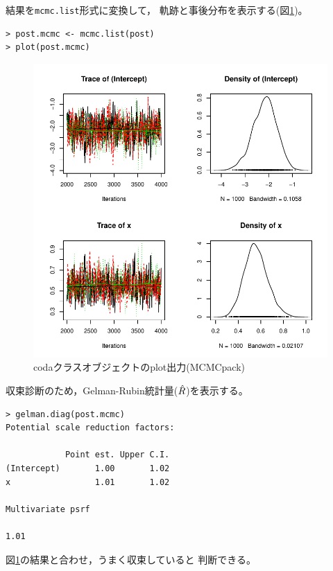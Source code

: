 \documentclass[11pt,uplatex]{jsarticle}
\begin{document}
結果を\texttt{mcmc.list}形式に変換して，
軌跡と事後分布を表示する(図\ref{plot_coda_mcmcpack})。
\begin{lstlisting}
> post.mcmc <- mcmc.list(post)
> plot(post.mcmc)
\end{lstlisting}


\begin{figure}[htbp]
	\begin{center}
		\includegraphics[bb=0 0 400 400, clip, width=300 bp]{example2_results.pdf}
	\end{center}
	\caption{\textsf{coda}クラスオブジェクトのplot出力(MCMCpack)}
	\label{plot_coda_mcmcpack}
\end{figure}

収束診断のため，Gelman-Rubin統計量($\Hat{R}$)を表示する。
\begin{lstlisting}
> gelman.diag(post.mcmc)
Potential scale reduction factors:

            Point est. Upper C.I.
(Intercept)       1.00       1.02
x                 1.01       1.02

Multivariate psrf

1.01
\end{lstlisting}
図\ref{plot_coda_mcmcpack}の結果と合わせ，うまく収束していると
判断できる。

\vspace{1zw}
\end{document}
